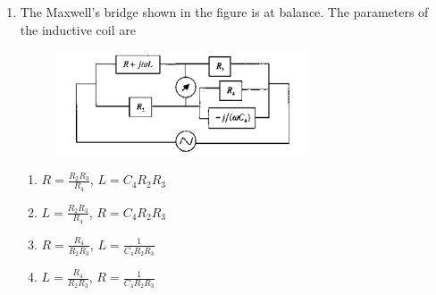 \documentclass[12pt]{article}
\theoremstyle{remark}
\begin{document}
\begin{enumerate}
\item The Maxwell's bridge shown in the figure is at balance. The parameters of the inductive coil are
\begin{figure}[H]
    \centering
    \includegraphics[width=0.7\textwidth]{Figs/Q35.png}
    \caption{}
    \label{fig:1.24}
\end{figure}
\begin{enumerate}
    \item $R=\frac{R_2 R_3}{R_4}$, $L=C_4 R_2 R_3$
    \item $L=\frac{R_2 R_3}{R_4}$, $R=C_4 R_2 R_3$
    \item $R=\frac{R_4}{R_2 R_3}$, $L=\frac{1}{C_4 R_2 R_3}$
    \item $L=\frac{R_4}{R_2 R_3}$, $R=\frac{1}{C_4 R_2 R_3}$
\end{enumerate}
\hfill{}


\end{enumerate}
\end{document}
